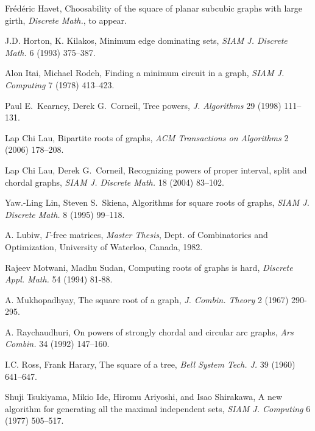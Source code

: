 \documentclass[proceedings]{stacs}
\newlength{\ai}
\begin{document}
\begin{thebibliography}{99}
  Fr\'ed\'eric Havet,
  Choosability of the square of planar subcubic graphs with large girth,
  {\sl Discrete Math.}, to appear.

  J.D. Horton, K. Kilakos,
  Minimum edge dominating sets,
  {\sl SIAM J. Discrete Math.} 6 (1993) 375--387.

  Alon Itai, Michael Rodeh,
  Finding a minimum circuit in a graph,
  {\sl SIAM J. Computing} 7 (1978) 413--423.

  Paul E.~Kearney, Derek G.~Corneil,
  Tree powers,
  {\sl J. Algorithms} 29 (1998) 111--131.

  Lap Chi Lau,
  Bipartite roots of graphs,
  {\sl ACM Transactions on Algorithms} 2 (2006) 178--208.

  Lap Chi Lau, Derek G.~Corneil,
  Recognizing powers of proper interval, split and chordal graphs,
  {\sl SIAM J. Discrete Math.} 18 (2004) 83--102.

  Yaw.-Ling Lin, Steven S.~Skiena,
  Algorithms for square roots of graphs,
  {\sl SIAM J. Discrete Math.} 8 (1995) 99--118.

  A. Lubiw,
  $\Gamma$-free matrices,
  {\sl Master Thesis}, Dept. of Combinatorics and Optimization, University of Waterloo, Canada, 1982.

  Rajeev Motwani, Madhu Sudan,
  Computing roots of graphs is hard,
  {\sl Discrete Appl. Math.} 54 (1994) 81-88.

  A. Mukhopadhyay,
  The square root of a graph,
  {\sl J. Combin. Theory} 2 (1967) 290-295.

  A. Raychaudhuri,
  On powers of strongly chordal and circular arc graphs,
  {\sl Ars Combin.} 34 (1992) 147--160.

  I.C. Ross, Frank Harary,
  The square of a tree,
  {\sl Bell System Tech. J.} 39 (1960) 641--647.

  Shuji Tsukiyama, Mikio Ide, Hiromu Ariyoshi, and Isao Shirakawa,
  A new algorithm for generating all the maximal independent sets,
  {\sl SIAM J. Computing} 6 (1977) 505--517.

\end{thebibliography}
\end{document}
